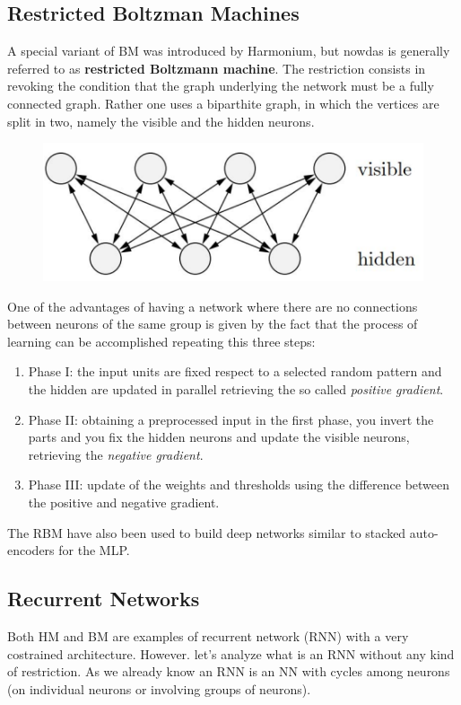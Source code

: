 \documentclass{article}
\begin{document}
\subsection{Restricted Boltzman Machines}
A special variant of BM was introduced by Harmonium, but nowdas is generally referred to as
\textbf{restricted Boltzmann machine}. The restriction consists in revoking the condition that the
graph underlying the network must be a fully connected graph. Rather one uses a biparthite
graph, in which the vertices are split in two, namely the visible and the hidden neurons.
\begin{figure}[H]
    \centering
    \includegraphics[scale=0.5]{images/boltzmann.png}
\end{figure}

One of the advantages of having a network where there are no connections between neurons of
the same group is given by the fact that the process of learning can be accomplished repeating
this three steps:
\begin{enumerate}
    \item Phase I: the input units are fixed respect to a selected random pattern
          and the hidden are updated in parallel retrieving the so called \textit{positive gradient}.
    \item Phase II: obtaining a preprocessed input in the first phase, you invert the parts
          and you fix the hidden neurons and update the visible neurons, retrieving the \textit{negative
              gradient}.
    \item Phase III: update of the weights and thresholds using the difference between the
          positive and negative gradient.
\end{enumerate}

The RBM have also been used to build deep networks similar to stacked auto-encoders for
the MLP.

\subsection{Recurrent Networks}
Both HM and BM are examples of recurrent network (RNN) with a very costrained architecture. However.
let's analyze what is an RNN without any kind of restriction. As we already know an RNN is an
NN with cycles among neurons (on individual neurons or involving groups of neurons).
\end{document}
